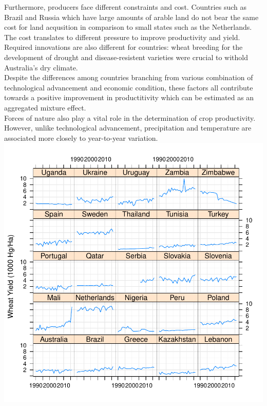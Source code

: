 \documentclass[nojss]{jss}
\begin{document}
Furthermore, producers face different constraints and cost. Countries
such as Brazil and Russia which have large amounts of arable land do
not bear the same cost for land acqusition in comparison to small
states such as the Netherlands. The cost translates to different
pressure to improve productivity and yield. Required innovations are
also different for countries: wheat breeding for the development of
drought and disease-resistent varieties were crucial to withold
Australia's dry climate.  \\

Despite the differences among countries branching from various
combination of technological advancement and economic condition, these
factors all contribute towards a positive improvement in productitivity
which can be estimated as an aggregated mixture effect.\\

Forces of nature also play a vital role in the determination of crop
productivity. However, unlike technological advancement, precipitation
and temperature are associated more closely to year-to-year variation.\\


\includegraphics{methodologyImputation-wheat-yield-explore}

\newpage

\FloatBarrier
\end{document}

